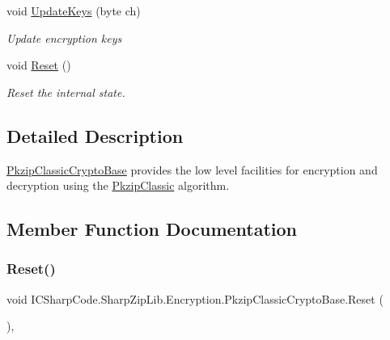 \begin{DoxyCompactItemize}
void \hyperlink{class_i_c_sharp_code_1_1_sharp_zip_lib_1_1_encryption_1_1_pkzip_classic_crypto_base_a7ee277def4a9c274b50619991fd4aa34}{Update\+Keys} (byte ch)
\begin{DoxyCompactList}\small\item\em Update encryption keys \end{DoxyCompactList}\item 
void \hyperlink{class_i_c_sharp_code_1_1_sharp_zip_lib_1_1_encryption_1_1_pkzip_classic_crypto_base_aaf029090e29dd232d503dbe33bda2a75}{Reset} ()
\begin{DoxyCompactList}\small\item\em Reset the internal state. \end{DoxyCompactList}\end{DoxyCompactItemize}


\subsection{Detailed Description}
\hyperlink{class_i_c_sharp_code_1_1_sharp_zip_lib_1_1_encryption_1_1_pkzip_classic_crypto_base}{Pkzip\+Classic\+Crypto\+Base} provides the low level facilities for encryption and decryption using the \hyperlink{class_i_c_sharp_code_1_1_sharp_zip_lib_1_1_encryption_1_1_pkzip_classic}{Pkzip\+Classic} algorithm. 



\subsection{Member Function Documentation}
\mbox{\label{class_i_c_sharp_code_1_1_sharp_zip_lib_1_1_encryption_1_1_pkzip_classic_crypto_base_aaf029090e29dd232d503dbe33bda2a75}} 
\subsubsection{\texorpdfstring{Reset()}{Reset()}\hspace{0.1cm}{\footnotesize\ttfamily [1/2]}}
{\footnotesize\ttfamily void I\+C\+Sharp\+Code.\+Sharp\+Zip\+Lib.\+Encryption.\+Pkzip\+Classic\+Crypto\+Base.\+Reset (\begin{DoxyParamCaption}{ }\end{DoxyParamCaption})\hspace{0.3cm}{\ttfamily [inline]}, {\ttfamily [protected]}}



